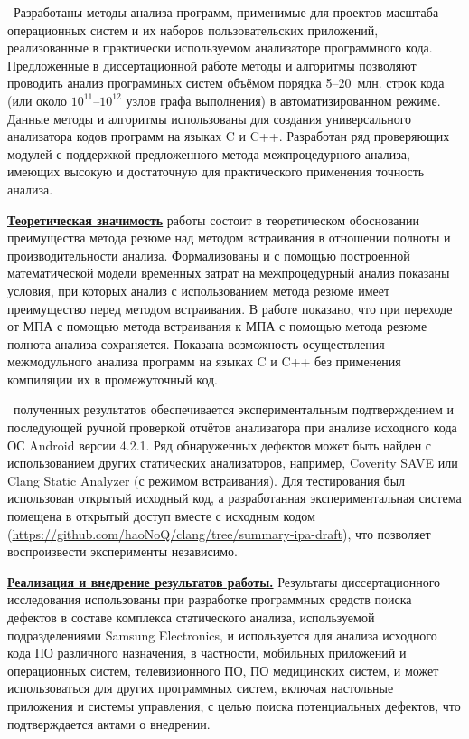 \influence\ Разработаны методы анализа программ, применимые для проектов масштаба операционных систем и их наборов пользовательских приложений, реализованные в практически используемом анализаторе программного кода. Предложенные в диссертационной работе методы и алгоритмы позволяют проводить анализ программных систем объёмом порядка 5--20~млн. строк кода (или около $10^{11}$--$10^{12}$ узлов графа выполнения) в автоматизированном режиме. Данные методы и алгоритмы использованы для создания универсального анализатора кодов программ на языках C и C++. Разработан ряд проверяющих модулей с поддержкой предложенного метода межпроцедурного анализа, имеющих высокую и достаточную для практического применения точность анализа.

\underline{\textbf{Теоретическая значимость}} работы состоит в теоретическом обосновании преимущества метода резюме над методом встраивания в отношении полноты и производительности анализа. Формализованы и с помощью построенной математической модели временных затрат на межпроцедурный анализ показаны условия, при которых анализ с использованием метода резюме имеет преимущество перед методом встраивания. В работе показано, что при переходе от МПА с помощью метода встраивания к МПА с помощью метода резюме полнота анализа сохраняется. Показана возможность осуществления межмодульного анализа программ на языках C и C++ без применения компиляции их в промежуточный код.

\reliability\ полученных результатов обеспечивается экспериментальным подтверждением и последующей ручной проверкой отчётов анализатора при анализе исходного кода ОС Android версии 4.2.1. Ряд обнаруженных дефектов может быть найден с использованием других статических анализаторов, например, Coverity SAVE или Clang Static Analyzer (с режимом встраивания). Для тестирования был использован открытый исходный код, а разработанная экспериментальная система помещена в открытый доступ вместе с исходным кодом (\url{https://github.com/haoNoQ/clang/tree/summary-ipa-draft}), что позволяет воспроизвести эксперименты независимо.

\underline{\textbf{Реализация и внедрение результатов работы.}} Результаты диссертационного исследования использованы при разработке программных средств поиска дефектов в составе комплекса статического анализа, используемой подразделениями Samsung Electronics, и используется для анализа исходного кода ПО различного назначения, в частности, мобильных приложений и операционных систем, телевизионного ПО, ПО медицинских систем, и может использоваться для других программных систем, включая настольные приложения и системы управления, с целью поиска потенциальных дефектов, что подтверждается актами о внедрении.


